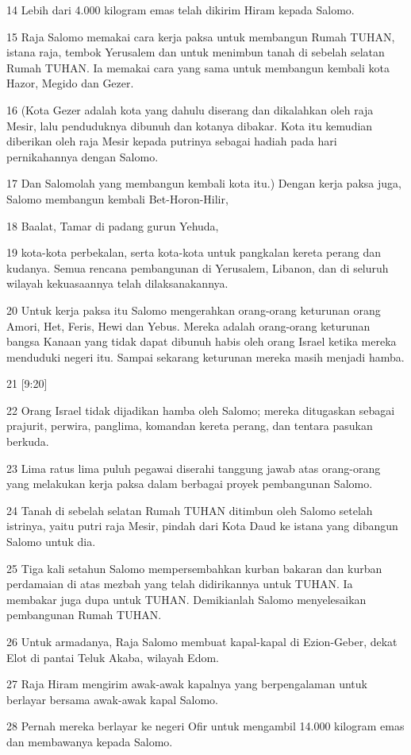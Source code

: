 \par 14 Lebih dari 4.000 kilogram emas telah dikirim Hiram kepada Salomo.
\par 15 Raja Salomo memakai cara kerja paksa untuk membangun Rumah TUHAN, istana raja, tembok Yerusalem dan untuk menimbun tanah di sebelah selatan Rumah TUHAN. Ia memakai cara yang sama untuk membangun kembali kota Hazor, Megido dan Gezer.
\par 16 (Kota Gezer adalah kota yang dahulu diserang dan dikalahkan oleh raja Mesir, lalu penduduknya dibunuh dan kotanya dibakar. Kota itu kemudian diberikan oleh raja Mesir kepada putrinya sebagai hadiah pada hari pernikahannya dengan Salomo.
\par 17 Dan Salomolah yang membangun kembali kota itu.) Dengan kerja paksa juga, Salomo membangun kembali Bet-Horon-Hilir,
\par 18 Baalat, Tamar di padang gurun Yehuda,
\par 19 kota-kota perbekalan, serta kota-kota untuk pangkalan kereta perang dan kudanya. Semua rencana pembangunan di Yerusalem, Libanon, dan di seluruh wilayah kekuasaannya telah dilaksanakannya.
\par 20 Untuk kerja paksa itu Salomo mengerahkan orang-orang keturunan orang Amori, Het, Feris, Hewi dan Yebus. Mereka adalah orang-orang keturunan bangsa Kanaan yang tidak dapat dibunuh habis oleh orang Israel ketika mereka menduduki negeri itu. Sampai sekarang keturunan mereka masih menjadi hamba.
\par 21 [9:20]
\par 22 Orang Israel tidak dijadikan hamba oleh Salomo; mereka ditugaskan sebagai prajurit, perwira, panglima, komandan kereta perang, dan tentara pasukan berkuda.
\par 23 Lima ratus lima puluh pegawai diserahi tanggung jawab atas orang-orang yang melakukan kerja paksa dalam berbagai proyek pembangunan Salomo.
\par 24 Tanah di sebelah selatan Rumah TUHAN ditimbun oleh Salomo setelah istrinya, yaitu putri raja Mesir, pindah dari Kota Daud ke istana yang dibangun Salomo untuk dia.
\par 25 Tiga kali setahun Salomo mempersembahkan kurban bakaran dan kurban perdamaian di atas mezbah yang telah didirikannya untuk TUHAN. Ia membakar juga dupa untuk TUHAN. Demikianlah Salomo menyelesaikan pembangunan Rumah TUHAN.
\par 26 Untuk armadanya, Raja Salomo membuat kapal-kapal di Ezion-Geber, dekat Elot di pantai Teluk Akaba, wilayah Edom.
\par 27 Raja Hiram mengirim awak-awak kapalnya yang berpengalaman untuk berlayar bersama awak-awak kapal Salomo.
\par 28 Pernah mereka berlayar ke negeri Ofir untuk mengambil 14.000 kilogram emas dan membawanya kepada Salomo.

